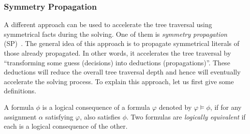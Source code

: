 \subsubsection{Symmetry Propagation}
A different approach can be used to accelerate the tree traversal using symmetrical facts during the solving.
One of them is \emph{symmetry propagation} (SP)~\cite{Devriendt12}.
The general idea of this approach is to propagate symmetrical literals of those already propagated.
In other words, it accelerates the tree traversal by ``transforming some guess (decisions) into deductions (propagations)''.
These deductions will reduce the overall tree traversal depth and hence will eventually accelerate the solving process. To explain this approach, let us first give some definitions.
\begin{definition}
 \label{def:logical_consequence}
 A formula $\phi$ is a logical consequence of a formula $\varphi$ denoted by $\varphi \models \phi$, if for any assignment
 $\alpha$ satisfying $\varphi$, also satisfies $\phi$. Two formulas are \emph{logically equivalent} if each is a logical
 consequence of the other.
\end{definition}

\clearpage

